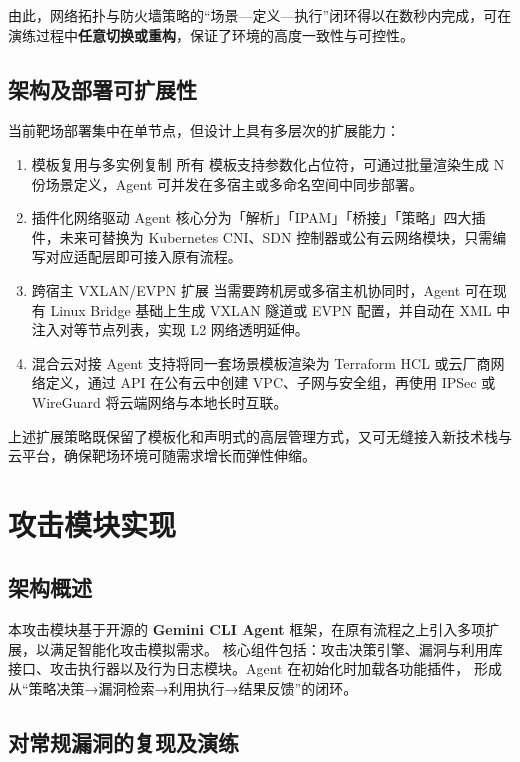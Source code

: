 \documentclass[lang=cn,10pt]{elegantbook}
\begin{document}
由此，网络拓扑与防火墙策略的“场景—定义—执行”闭环得以在数秒内完成，可在演练过程中\textbf{任意切换或重构}，保证了环境的高度一致性与可控性。


\subsection{架构及部署可扩展性}

当前靶场部署集中在单节点，但设计上具有多层次的扩展能力：

\begin{enumerate}
  \item 模板复用与多实例复制  
        所有  模板支持参数化占位符，可通过批量渲染生成 N 份场景定义，Agent 可并发在多宿主或多命名空间中同步部署。  
  \item 插件化网络驱动  
        Agent 核心分为「解析」「IPAM」「桥接」「策略」四大插件，未来可替换为 Kubernetes CNI、SDN 控制器或公有云网络模块，只需编写对应适配层即可接入原有流程。  
  \item 跨宿主 VXLAN/EVPN 扩展  
        当需要跨机房或多宿主机协同时，Agent 可在现有 Linux Bridge 基础上生成 VXLAN 隧道或 EVPN 配置，并自动在 XML 中注入对等节点列表，实现 L2 网络透明延伸。  
  \item 混合云对接  
        Agent 支持将同一套场景模板渲染为 Terraform HCL 或云厂商网络定义，通过 API 在公有云中创建 VPC、子网与安全组，再使用 IPSec 或 WireGuard 将云端网络与本地长时互联。  
\end{enumerate}

上述扩展策略既保留了模板化和声明式的高层管理方式，又可无缝接入新技术栈与云平台，确保靶场环境可随需求增长而弹性伸缩。




\section{攻击模块实现}
\subsection{架构概述}
本攻击模块基于开源的 \textbf{Gemini CLI Agent} 框架，在原有流程之上引入多项扩展，以满足智能化攻击模拟需求。
核心组件包括：攻击决策引擎、漏洞与利用库接口、攻击执行器以及行为日志模块。Agent 在初始化时加载各功能插件，
形成从“策略决策→漏洞检索→利用执行→结果反馈”的闭环。

\subsection{对常规漏洞的复现及演练}
\end{document}

